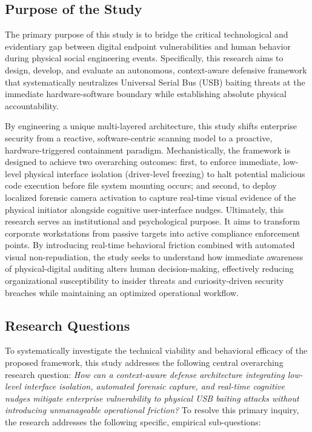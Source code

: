 \documentclass{ieeeaccess}
\begin{document}
\subsection{Purpose of the Study}
The primary purpose of this study is to bridge the critical technological and evidentiary gap between digital endpoint vulnerabilities and human behavior during physical social engineering events. Specifically, this research aims to design, develop, and evaluate an autonomous, context-aware defensive framework that systematically neutralizes Universal Serial Bus (USB) baiting threats at the immediate hardware-software boundary while establishing absolute physical accountability.

By engineering a unique multi-layered architecture, this study shifts enterprise security from a reactive, software-centric scanning model to a proactive, hardware-triggered containment paradigm. Mechanistically, the framework is designed to achieve two overarching outcomes: first, to enforce immediate, low-level physical interface isolation (driver-level freezing) to halt potential malicious code execution before file system mounting occurs; and second, to deploy localized forensic camera activation to capture real-time visual evidence of the physical initiator alongside cognitive user-interface nudges. Ultimately, this research serves an institutional and psychological purpose. It aims to transform corporate workstations from passive targets into active compliance enforcement points. By introducing real-time behavioral friction combined with automated visual non-repudiation, the study seeks to understand how immediate awareness of physical-digital auditing alters human decision-making, effectively reducing organizational susceptibility to insider threats and curiosity-driven security breaches while maintaining an optimized operational workflow.

\subsection{Research Questions}
To systematically investigate the technical viability and behavioral efficacy of the proposed framework, this study addresses the following central overarching research question: \textit{How can a context-aware defense architecture integrating low-level interface isolation, automated forensic capture, and real-time cognitive nudges mitigate enterprise vulnerability to physical USB baiting attacks without introducing unmanageable operational friction?} To resolve this primary inquiry, the research addresses the following specific, empirical sub-questions:
  
\end{document}
